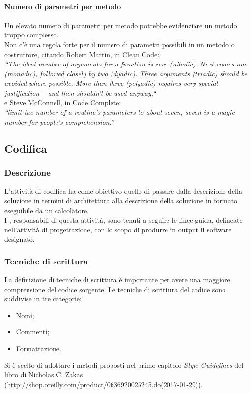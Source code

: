 \documentclass[../NormeDiProgetto.tex]{subfiles}
\begin{document}
				\paragraph{Numero di parametri per metodo}
				Un elevato numero di parametri per metodo potrebbe evidenziare un metodo troppo complesso.\\
				Non c'è una regola forte per il numero di parametri possibili in un metodo o costruttore, citando Robert Martin, in Clean Code:\\
\textit{“The ideal number of arguments for a function is zero (niladic). Next comes one (monadic), followed closely by two (dyadic). Three arguments (triadic) should be avoided where possible. More than three (polyadic) requires very special justification – and then shouldn’t be used anyway.“}\\
e Steve McConnell, in Code Complete:\\
\textit{“limit the number of a routine’s parameters to about seven, seven is a magic number for people’s comprehension.”}\\

      \subsection{Codifica}
            \subsubsection{Descrizione}
                  L'attività di codifica ha come obiettivo quello di passare dalla descrizione della soluzione in termini di architettura alla descrizione della soluzione in formato eseguibile da un calcolatore. \\ I \programmatori, responsabili di questa attività, sono tenuti a seguire le linee guida, delineate nell'attività di progettazione, con lo scopo di produrre in output il software designato.

            \subsubsection{Tecniche di scrittura}
                  La definizione di tecniche di scrittura è importante per avere una maggiore comprensione del codice sorgente. Le tecniche di scrittura del codice sono suddivise in tre categorie:
                  \begin{itemize}
                        \item Nomi;
                        \item Commenti;
                        \item Formattazione.
                  \end{itemize}
                  Si è scelto di adottare i metodi proposti nel primo capitolo \textit{Style Guidelines} del libro  di Nicholas C. Zakas (\url{http://shop.oreilly.com/product/0636920025245.do}(2017-01-29)).
                  
\end{document}
